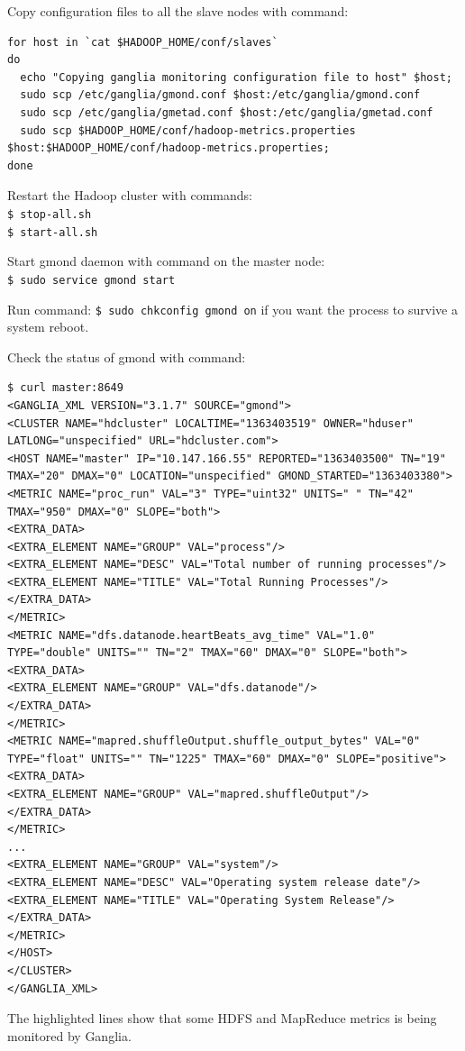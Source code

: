 Copy configuration files to all the slave nodes with command: 
\begin{verbatim}
for host in `cat $HADOOP_HOME/conf/slaves`
do
  echo "Copying ganglia monitoring configuration file to host" $host;
  sudo scp /etc/ganglia/gmond.conf $host:/etc/ganglia/gmond.conf
  sudo scp /etc/ganglia/gmetad.conf $host:/etc/ganglia/gmetad.conf
  sudo scp $HADOOP_HOME/conf/hadoop-metrics.properties $host:$HADOOP_HOME/conf/hadoop-metrics.properties;
done
\end{verbatim}

Restart the Hadoop cluster with commands: \\
\verb|$ stop-all.sh| \\
\verb|$ start-all.sh|

Start gmond daemon with command on the master node: \\
\verb|$ sudo service gmond start|

Run command: \verb|$ sudo chkconfig gmond on| if you want the process to survive a system reboot.

Check the status of gmond with command: 
\begin{verbatim}
$ curl master:8649
<GANGLIA_XML VERSION="3.1.7" SOURCE="gmond">
<CLUSTER NAME="hdcluster" LOCALTIME="1363403519" OWNER="hduser" LATLONG="unspecified" URL="hdcluster.com">
<HOST NAME="master" IP="10.147.166.55" REPORTED="1363403500" TN="19" TMAX="20" DMAX="0" LOCATION="unspecified" GMOND_STARTED="1363403380">
<METRIC NAME="proc_run" VAL="3" TYPE="uint32" UNITS=" " TN="42" TMAX="950" DMAX="0" SLOPE="both">
<EXTRA_DATA>
<EXTRA_ELEMENT NAME="GROUP" VAL="process"/>
<EXTRA_ELEMENT NAME="DESC" VAL="Total number of running processes"/>
<EXTRA_ELEMENT NAME="TITLE" VAL="Total Running Processes"/>
</EXTRA_DATA>
</METRIC>
<METRIC NAME="dfs.datanode.heartBeats_avg_time" VAL="1.0" TYPE="double" UNITS="" TN="2" TMAX="60" DMAX="0" SLOPE="both">
<EXTRA_DATA>
<EXTRA_ELEMENT NAME="GROUP" VAL="dfs.datanode"/>
</EXTRA_DATA>
</METRIC>
<METRIC NAME="mapred.shuffleOutput.shuffle_output_bytes" VAL="0" TYPE="float" UNITS="" TN="1225" TMAX="60" DMAX="0" SLOPE="positive">
<EXTRA_DATA>
<EXTRA_ELEMENT NAME="GROUP" VAL="mapred.shuffleOutput"/>
</EXTRA_DATA>
</METRIC>
...
<EXTRA_ELEMENT NAME="GROUP" VAL="system"/>
<EXTRA_ELEMENT NAME="DESC" VAL="Operating system release date"/>
<EXTRA_ELEMENT NAME="TITLE" VAL="Operating System Release"/>
</EXTRA_DATA>
</METRIC>
</HOST>
</CLUSTER>
</GANGLIA_XML>
\end{verbatim}

The highlighted lines show that some HDFS and MapReduce metrics is being monitored by Ganglia.

